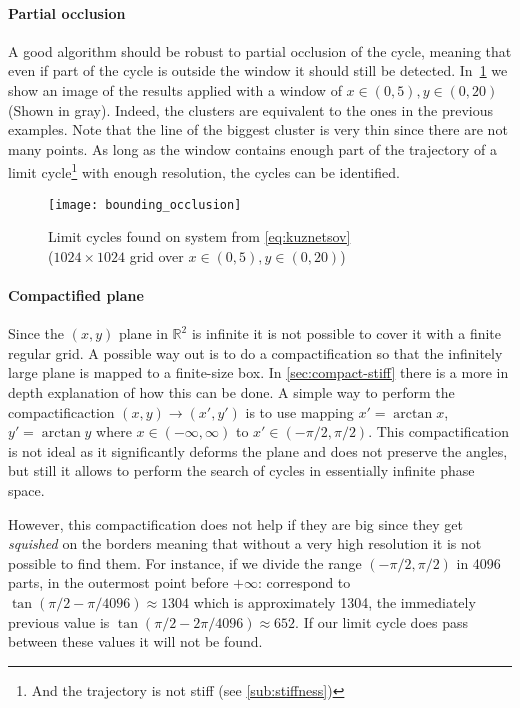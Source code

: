 \pagebreak
\paragraph{Partial occlusion}

A good algorithm should be robust to partial occlusion of the cycle, meaning that even if part of the cycle is outside the window it should still be detected. In~\cref{fig:bounding_occ} we show an image of the results applied with a window of $x \in (0, 5), y \in (0, 20)$ (Shown in gray). Indeed, the clusters are equivalent to the ones in the previous examples. Note that the line of the biggest cluster is very thin
since there are not many points. As long as the window contains enough part of the trajectory of a limit cycle\footnote{And the trajectory is not stiff (see \cref{sub:stiffness})} with enough resolution, the cycles can be identified.

\begin{figure}[H]
    \centering
    \texttt{[image: bounding\_occlusion]}
    \caption{Limit cycles found on system from \cref{eq:kuznetsov} \\
        ($1024 \times 1024$ grid over $x \in (0, 5), y \in (0, 20)$)
    }%
    \label{fig:bounding_occ}
\end{figure}

\pagebreak
\paragraph{Compactified plane}

Since the $(x,y)$ plane in $\mathbb{R}^2$ is infinite it is not possible to cover it with a finite regular grid. A possible way out is
to do a compactification so that the infinitely large plane is mapped to a finite-size box. In \cref{sec:compact-stiff} there is a more in depth explanation of how this can be done. A simple way to perform the compactificaction $(x,y)\to(x',y')$ is to use mapping $x' = \arctan x$, $y' = \arctan y$ where $x\in(-\infty, \infty)$ to $x'\in(-\pi/2, \pi/2)$. This compactification is not ideal as it significantly deforms the plane and does not preserve the angles, but still it allows to perform the search of cycles in essentially infinite phase space.

However, this compactification does not help if they are big since they get
\emph{squished} on the borders meaning that without a very high resolution it is
not possible to find them. For instance, if we divide the range $(-\pi/2,
\pi/2)$ in 4096 parts, in the outermost point before $+\infty$: correspond to
$\tan\left(\pi/2 - \pi/4096\right) \approx 1304$ which is approximately 1304, the
immediately previous value is $\tan\left(\pi/2 - 2\pi/4096\right) \approx 652$. If
our limit cycle does pass between these values it will not be found.

